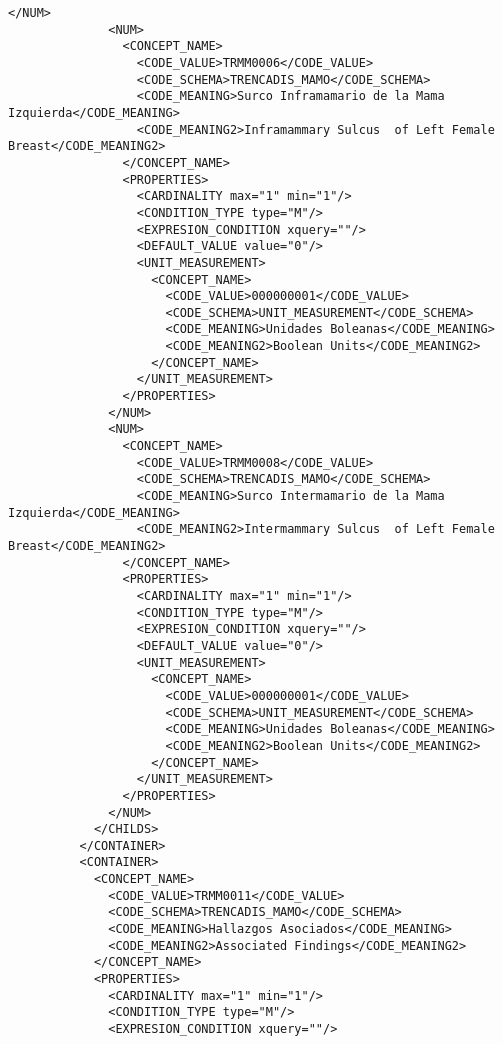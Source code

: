 \begin{lstlisting}[label=some-code,caption=Some Code]
              </NUM>
              <NUM>
                <CONCEPT_NAME>
                  <CODE_VALUE>TRMM0006</CODE_VALUE>
                  <CODE_SCHEMA>TRENCADIS_MAMO</CODE_SCHEMA>
                  <CODE_MEANING>Surco Inframamario de la Mama Izquierda</CODE_MEANING>
                  <CODE_MEANING2>Inframammary Sulcus  of Left Female Breast</CODE_MEANING2>
                </CONCEPT_NAME>
                <PROPERTIES>
                  <CARDINALITY max="1" min="1"/>
                  <CONDITION_TYPE type="M"/>
                  <EXPRESION_CONDITION xquery=""/>
                  <DEFAULT_VALUE value="0"/>
                  <UNIT_MEASUREMENT>
                    <CONCEPT_NAME>
                      <CODE_VALUE>000000001</CODE_VALUE>
                      <CODE_SCHEMA>UNIT_MEASUREMENT</CODE_SCHEMA>
                      <CODE_MEANING>Unidades Boleanas</CODE_MEANING>
                      <CODE_MEANING2>Boolean Units</CODE_MEANING2>
                    </CONCEPT_NAME>
                  </UNIT_MEASUREMENT>
                </PROPERTIES>
              </NUM>
              <NUM>
                <CONCEPT_NAME>
                  <CODE_VALUE>TRMM0008</CODE_VALUE>
                  <CODE_SCHEMA>TRENCADIS_MAMO</CODE_SCHEMA>
                  <CODE_MEANING>Surco Intermamario de la Mama Izquierda</CODE_MEANING>
                  <CODE_MEANING2>Intermammary Sulcus  of Left Female Breast</CODE_MEANING2>
                </CONCEPT_NAME>
                <PROPERTIES>
                  <CARDINALITY max="1" min="1"/>
                  <CONDITION_TYPE type="M"/>
                  <EXPRESION_CONDITION xquery=""/>
                  <DEFAULT_VALUE value="0"/>
                  <UNIT_MEASUREMENT>
                    <CONCEPT_NAME>
                      <CODE_VALUE>000000001</CODE_VALUE>
                      <CODE_SCHEMA>UNIT_MEASUREMENT</CODE_SCHEMA>
                      <CODE_MEANING>Unidades Boleanas</CODE_MEANING>
                      <CODE_MEANING2>Boolean Units</CODE_MEANING2>
                    </CONCEPT_NAME>
                  </UNIT_MEASUREMENT>
                </PROPERTIES>
              </NUM>
            </CHILDS>
          </CONTAINER>
          <CONTAINER>
            <CONCEPT_NAME>
              <CODE_VALUE>TRMM0011</CODE_VALUE>
              <CODE_SCHEMA>TRENCADIS_MAMO</CODE_SCHEMA>
              <CODE_MEANING>Hallazgos Asociados</CODE_MEANING>
              <CODE_MEANING2>Associated Findings</CODE_MEANING2>
            </CONCEPT_NAME>
            <PROPERTIES>
              <CARDINALITY max="1" min="1"/>
              <CONDITION_TYPE type="M"/>
              <EXPRESION_CONDITION xquery=""/>

\end{lstlisting}
